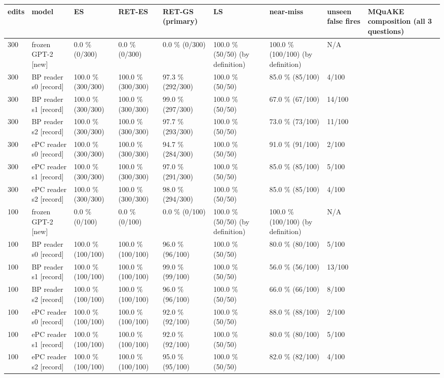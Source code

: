 \documentclass[10pt,a4paper]{article}
\begin{document}
\begin{center}\scriptsize
\begin{tabularx}{\textwidth}{@{}p{}XXXXXXXX@{}}
\toprule
edits & model & ES & RET-ES & RET-GS (primary) & LS & near-miss & unseen false fires & MQuAKE composition (all 3 questions) \\ \midrule
300 & frozen GPT-2 [new] & 0.0 \% (0/300) & 0.0 \% (0/300) & 0.0 \% (0/300) & 100.0 \% (50/50) (by definition) & 100.0 \% (100/100) (by definition) & N/A &  \\
300 & BP reader s0 [record] & 100.0 \% (300/300) & 100.0 \% (300/300) & 97.3 \% (292/300) & 100.0 \% (50/50) & 85.0 \% (85/100) & 4/100 &  \\
300 & BP reader s1 [record] & 100.0 \% (300/300) & 100.0 \% (300/300) & 99.0 \% (297/300) & 100.0 \% (50/50) & 67.0 \% (67/100) & 14/100 &  \\
300 & BP reader s2 [record] & 100.0 \% (300/300) & 100.0 \% (300/300) & 97.7 \% (293/300) & 100.0 \% (50/50) & 73.0 \% (73/100) & 11/100 &  \\
300 & ePC reader s0 [record] & 100.0 \% (300/300) & 100.0 \% (300/300) & 94.7 \% (284/300) & 100.0 \% (50/50) & 91.0 \% (91/100) & 2/100 &  \\
300 & ePC reader s1 [record] & 100.0 \% (300/300) & 100.0 \% (300/300) & 97.0 \% (291/300) & 100.0 \% (50/50) & 85.0 \% (85/100) & 5/100 &  \\
300 & ePC reader s2 [record] & 100.0 \% (300/300) & 100.0 \% (300/300) & 98.0 \% (294/300) & 100.0 \% (50/50) & 85.0 \% (85/100) & 4/100 &  \\
100 & frozen GPT-2 [new] & 0.0 \% (0/100) & 0.0 \% (0/100) & 0.0 \% (0/100) & 100.0 \% (50/50) (by definition) & 100.0 \% (100/100) (by definition) & N/A &  \\
100 & BP reader s0 [record] & 100.0 \% (100/100) & 100.0 \% (100/100) & 96.0 \% (96/100) & 100.0 \% (50/50) & 80.0 \% (80/100) & 5/100 &  \\
100 & BP reader s1 [record] & 100.0 \% (100/100) & 100.0 \% (100/100) & 99.0 \% (99/100) & 100.0 \% (50/50) & 56.0 \% (56/100) & 13/100 &  \\
100 & BP reader s2 [record] & 100.0 \% (100/100) & 100.0 \% (100/100) & 96.0 \% (96/100) & 100.0 \% (50/50) & 66.0 \% (66/100) & 8/100 &  \\
100 & ePC reader s0 [record] & 100.0 \% (100/100) & 100.0 \% (100/100) & 92.0 \% (92/100) & 100.0 \% (50/50) & 88.0 \% (88/100) & 2/100 &  \\
100 & ePC reader s1 [record] & 100.0 \% (100/100) & 100.0 \% (100/100) & 92.0 \% (92/100) & 100.0 \% (50/50) & 80.0 \% (80/100) & 5/100 &  \\
100 & ePC reader s2 [record] & 100.0 \% (100/100) & 100.0 \% (100/100) & 95.0 \% (95/100) & 100.0 \% (50/50) & 82.0 \% (82/100) & 4/100 &  \\
\bottomrule
\end{tabularx}
\end{center}
\end{document}
